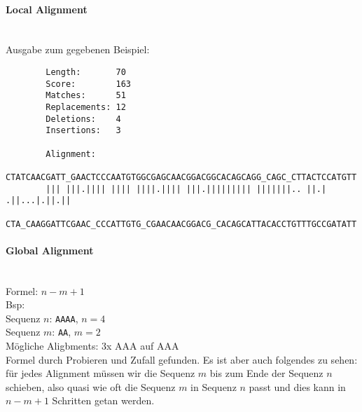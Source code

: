 \documentclass[a4paper,10pt]{article}
\begin{document}
	\parindent0pt
	\paragraph{Local Alignment}\ \\
		Ausgabe zum gegebenen Beispiel:
		\begin{verbatim}
		Length:       70
		Score:        163
		Matches:      51
		Replacements: 12
		Deletions:    4
		Insertions:   3
		
		Alignment: 
		CTATCAACGATT_GAACTCCCAATGTGGCGAGCAACGGACGGCACAGCAGG_CAGC_CTTACTCCATGTT
		||| |||.|||| |||| ||||.|||| |||.||||||||| |||||||.. ||.| .||...|.||.||
		CTA_CAAGGATTCGAAC_CCCATTGTG_CGAACAACGGACG_CACAGCATTACACCTGTTTGCCGATATT
		\end{verbatim}
	
	\paragraph{Global Alignment}\ \\
	Formel: $n - m + 1$\\
	Bsp:\\
	Sequenz $n$: \verb|AAAA|, $n = 4$\\
	Sequenz $m$: \verb|AA|, $m = 2$\\
	Mögliche Aligbments: 3x AAA auf AAA\\
	Formel durch Probieren und Zufall gefunden. Es ist aber auch folgendes zu sehen: für jedes Alignment müssen wir die Sequenz $m$ bis zum Ende der Sequenz $n$ schieben, also quasi wie oft die Sequenz $m$ in Sequenz $n$ passt und dies kann in $n-m+1$ Schritten getan werden.
	
\end{document}
